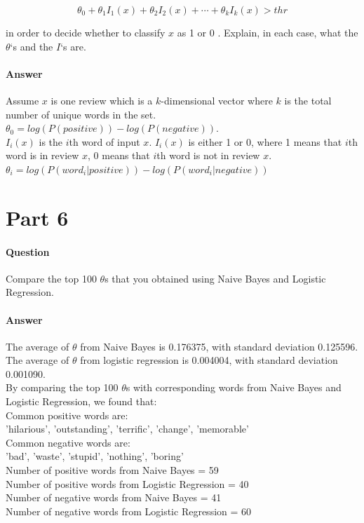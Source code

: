 \documentclass[11pt,twoside]{article}
\begin{document}
\[\theta_0+\theta_1I_1(x)+\theta_2I_2(x)+\cdots+\theta_kI_k(x) > thr\]

in order to decide whether to classify $x$ as 1 or 0 . Explain, in each case, what the $\theta$‘s and the $I$‘s are.

\paragraph{Answer}
Assume $x$ is one review which is a $k$-dimensional vector where $k$ is the total number of unique words in the set.\\
$\theta_0 = log(P(positive)) - log(P(negative))$.\\
$I_i(x)$ is the $i$th word of input $x$. $I_i(x)$ is either 1 or 0, where 1 means that $i$th word is in review $x$, 0 means that $i$th word is not in review $x$.\\
$\theta_i = log(P(word_i | positive))  - log(P(word_i | negative))$
\clearpage

\section*{Part 6}
\paragraph{Question}
Compare the top 100 $\theta$s that you obtained using Naive Bayes and Logistic Regression.
\paragraph{Answer}
The average of $\theta$ from Naive Bayes is 0.176375, with standard deviation 0.125596.\\
The average of $\theta$ from logistic regression is 0.004004, with standard deviation 0.001090.\\

By comparing the top 100 $\theta$s with corresponding words from Naive Bayes and Logistic Regression, we found that:\\

Common positive words are:\\
{'hilarious', 'outstanding', 'terrific', 'change', 'memorable'}\\

Common negative words are:\\
{'bad', 'waste', 'stupid', 'nothing', 'boring'}\\

Number of positive words from Naive Bayes = 59\\
Number of positive words from Logistic Regression = 40\\
Number of negative words from Naive Bayes = 41\\
Number of negative words from Logistic Regression = 60\\
\end{document}
